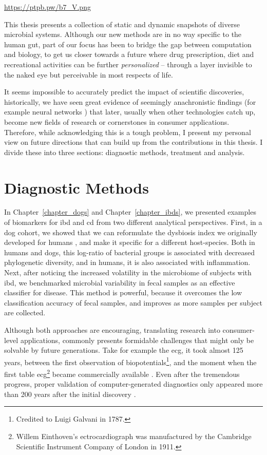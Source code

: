 \url{https://ptpb.pw/b7_V.png}

This thesis presents a collection of static and dynamic snapshots of diverse
microbial systems. Although our new methods are in no way specific to the human
gut, part of our focus has been to bridge the gap between computation and
biology, to get us closer towards a future where drug prescription, diet and
recreational activities can be further \textit{personalized} -- through a layer
invisible to the naked eye but perceivable in most respects of life.

It seems impossible to accurately predict the impact of scientific discoveries, 
historically, we have seen great evidence of seemingly anachronistic findings 
(for example neural networks \cite{Tem10}) that later, usually when other 
technologies catch up, become new fields of research or cornerstones in 
consumer applications.  Therefore, while acknowledging this is a tough problem, 
I present my personal view on future directions that can build up from the 
contributions in this thesis. I divide these into three sections: diagnostic 
methods, treatment and analysis.

\section{Diagnostic Methods}

In Chapter~\ref{chapter_dogs} and Chapter~\ref{chapter_ibds}, we presented
examples of biomarkers for \gls{ibd} and \gls{cd} from two different analytical 
perspectives.  First, in a dog cohort, we showed that we can reformulate the 
dysbiosis index we originally developed for humans \cite{Gevers2014}, and make 
it specific for a different host\hyp{}species. Both in humans and dogs, this 
log-ratio of bacterial groups is associated with decreased phylogenetic 
diversity, and in humans, it is also associated with inflammation.  Next, after 
noticing the increased volatility in the microbiome of subjects with \gls{ibd}, 
we benchmarked microbial variability in fecal samples as an effective 
classifier for disease.  This method is powerful, because it overcomes the low 
classification accuracy of fecal samples, and improves as more samples per 
subject are collected.

Although both approaches are encouraging, translating research into 
consumer\hyp{}level applications, commonly presents formidable challenges that 
might only be solvable by future generations.  Take for example the \gls{ecg}, 
it took almost 125 years, between the first observation of 
biopotentials\footnote{Credited to Luigi Galvani in 1787.}, and the moment when 
the first table \gls{ecg}\footnote{Willem Einthoven's ectrocardiograph was 
manufactured by the Cambridge Scientific Instrument Company of London in 1911.} 
became commercially available \cite{ECGZywietz}. Even after the tremendous 
progress, proper validation of computer-generated diagnostics only appeared 
more than 200 years after the initial discovery \cite{njem_ecg}.

